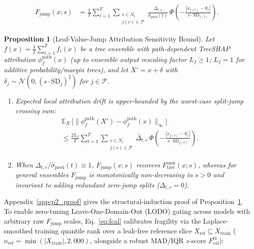 \documentclass[conference]{IEEEtran}
\newtheorem{proposition}{Proposition}
\begin{document}
\begin{equation}
\label{eq:fjump}
\begin{aligned}
F_{\mathrm{jump}}(x; s) &= \frac{1}{T}\sum_{t=1}^T \sum_{\substack{v \in N_t\\ j(v)\in\mathcal{P}}} \frac{\Delta_{t,v}}{\hat{\sigma}_{\mathrm{pred}}(t)}\, \Phi\!\left(-\frac{|x_{j(v)} - \theta_v|}{s\cdot\mathrm{SD}_{j(v)}}\right).
\end{aligned}
\end{equation}

\begin{proposition}[Leaf-Value-Jump Attribution Sensitivity Bound]
\label{prop:p2}
Let $f(x) = \frac{1}{T}\sum_{t=1}^T f_t(x)$ be a tree ensemble with path-dependent TreeSHAP attribution $\phi_f^{\mathrm{path}}(x)$ (up to ensemble output rescaling factor $L_f \ge 1$; $L_f=1$ for additive probability/margin trees), and let $X' = x + \delta$ with $\delta_j \sim \mathcal{N}(0, (s\cdot\mathrm{SD}_j)^2)$ for $j\in\mathcal{P}$.
\begin{enumerate}
    \item[(a)] Expected local attribution drift is upper-bounded by the worst-case split-jump crossing sum:
    \begin{equation}
    \label{eq:p2bound}
    \begin{aligned}
    \mathbb{E}_{X'}\big[\|\phi_f^{\mathrm{path}}(X') - \phi_f^{\mathrm{path}}(x)\|_\infty\big] & \\
    \le \frac{2 L_f}{T} \sum_{t=1}^T \sum_{\substack{v \in N_t\\ j(v)\in\mathcal{P}}} \bar{\Delta}_{t,v}\, \Phi\!\left(-\frac{|x_{j(v)} - \theta_v|}{s\cdot\mathrm{SD}_{j(v)}}\right). &
    \end{aligned}
    \end{equation}
    \item[(b)] When $\Delta_{t,v}/\hat{\sigma}_{\mathrm{pred}}(t) \equiv 1$, $F_{\mathrm{jump}}(x;s)$ recovers $F_{\mathrm{tree}}^{\mathrm{unw}}(x;s)$, whereas for general ensembles $F_{\mathrm{jump}}$ is monotonically non-decreasing in $s>0$ and invariant to adding redundant zero-jump splits ($\Delta_{t,v} = 0$).
\end{enumerate}
\end{proposition}
\noindent Appendix~\ref{app:p2_proof} gives the structural-induction proof of Proposition~\ref{prop:p2}. To enable zero-tuning Leave-One-Domain-Out (LODO) gating across models with arbitrary raw $F_{\mathrm{jump}}$ scales, Eq.~\eqref{eq:fcal} calibrates fragility via the Laplace-smoothed training quantile rank over a leak-free reference slice $X_{\mathrm{ref}}\subseteq X_{\mathrm{train}}$ ($n_{\mathrm{ref}} = \min(|X_{\mathrm{train}}|, 2{,}000)$, alongside a robust MAD/IQR $z$-score $F_{\mathrm{cal}}^{\mathrm{rz}}$):
\end{document}
